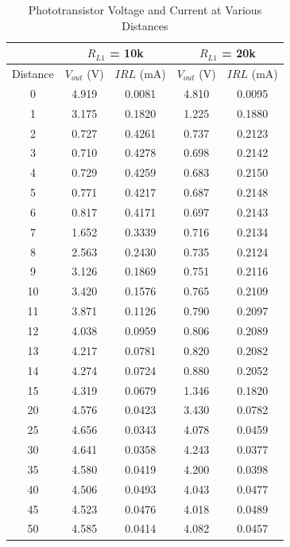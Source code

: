 \documentclass[conference]{IEEEtran}
\begin{document}
\begin{table}[H]
    \centering
    \caption{Phototransistor Voltage and Current at Various Distances}
    \label{distanceVoltageCurrent}
    \begin{tabular}{|c||c|c||c|c|}
        \hline
         & \multicolumn{2}{c||}{$R_{L1}$ = \textbf{10k}} & \multicolumn{2}{c|}{$R_{L1}$ = \textbf{20k}} \\
        \hline
        Distance & $V_{out}$ (V) & $IRL$ (mA) & $V_{out}$ (V) & $IRL$ (mA) \\
        \hline
        0 &  4.919 &  0.0081 & 4.810 & 0.0095 \\
        1 &  3.175 &  0.1820 & 1.225 & 0.1880 \\
        2 &  0.727 &  0.4261 & 0.737 & 0.2123 \\
        3 &  0.710 &  0.4278 & 0.698 & 0.2142 \\
        4 &  0.729 &  0.4259 & 0.683 & 0.2150 \\
        5 &  0.771 &  0.4217 & 0.687 & 0.2148 \\
        6 &  0.817 &  0.4171 & 0.697 & 0.2143 \\
        7 &  1.652 &  0.3339 & 0.716 & 0.2134 \\
        8 &  2.563 &  0.2430 & 0.735 & 0.2124 \\
        9 &  3.126 &  0.1869 & 0.751 & 0.2116 \\
        10 & 3.420 &  0.1576 & 0.765 & 0.2109 \\
        11 & 3.871 &  0.1126 & 0.790 & 0.2097 \\
        12 & 4.038 &  0.0959 & 0.806 & 0.2089 \\
        13 & 4.217 &  0.0781 & 0.820 & 0.2082 \\
        14 & 4.274 &  0.0724 & 0.880 & 0.2052 \\
        15 & 4.319 &  0.0679 & 1.346 & 0.1820 \\
        20 & 4.576 &  0.0423 & 3.430 & 0.0782 \\
        25 & 4.656 &  0.0343 & 4.078 & 0.0459 \\
        30 & 4.641 &  0.0358 & 4.243 & 0.0377 \\
        35 & 4.580 &  0.0419 & 4.200 & 0.0398 \\
        40 & 4.506 &  0.0493 & 4.043 & 0.0477 \\
        45 & 4.523 &  0.0476 & 4.018 & 0.0489 \\
        50 & 4.585 &  0.0414 & 4.082 & 0.0457 \\
        \hline
    \end{tabular}
\end{table}
\end{document}

